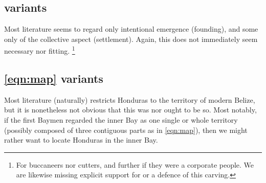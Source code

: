 	\subsection{ variants}
	\label{ss:possyemergences}
		Most literature seems to regard only intentional emergence (founding), and some only of the collective aspect (settlement). Again, this does not immediately seem necessary nor fitting.%
		\footnote{For buccaneers nor cutters, and further if they were a corporate people. We are likewise missing explicit support for or a defence of this carving.} %
	\subsection{\ref{eqn:map} variants}
	\label{ss:possymaps}
		Most literature (naturally) restricts Honduras to the territory of modern Belize, but it is nonetheless not obvious that this was nor ought to be so. Most notably, if the first Baymen regarded the inner Bay as one single or whole territory (possibly composed of three contiguous parts as in \ref{eqn:map}), then we might rather want to locate Honduras in the inner Bay.%
